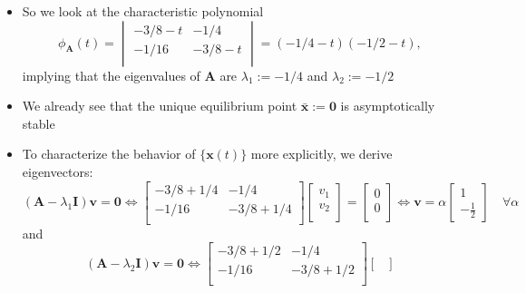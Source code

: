 \documentclass[12pt,a4paper]{article}
\begin{document}
\begin{itemize}
\begin{itemize}
  \item So we look at the characteristic polynomial
    \begin{equation}\nonumber%
      \phi_{\bm{A}}(t) = 
      \begin{vmatrix}
        -3/8 - t & -1/4 \\
        -1/16 & -3/8 - t \\
      \end{vmatrix}
      = (-1/4-t)(-1/2-t),
    \end{equation}
    implying that
    the eigenvalues of $\bm{A}$ are $\lambda_{1}:=-1/4$ and $\lambda_{2}:=-1/2$
  \item We already see that
    the unique equilibrium point
    $\bar{\bm{x}}:=\bm{0}$ is asymptotically stable
  \item To characterize the behavior of $\{\bm{x}(t)\}$ more explicitly,
    we derive eigenvectors:
    \begin{equation}\nonumber%
      (\bm{A}-\lambda_{1}\bm{I})\bm{v}
      = \bm{0}
      \iff
      \begin{bmatrix}
        -3/8 + 1/4 & - 1/4 \\
        -1/16 & -3/8 + 1/4 \\
      \end{bmatrix}
      \begin{bmatrix}
        v_{1} \\
        v_{2} \\
      \end{bmatrix}
      =
      \begin{bmatrix}
        0 \\
        0 \\
      \end{bmatrix}
      \iff
      \bm{v} = \alpha
      \begin{bmatrix}
        1 \\
        -\frac{1}{2}
      \end{bmatrix}
      \quad \forall \alpha
    \end{equation}
    and
    \begin{equation}\nonumber%
      (\bm{A}-\lambda_{2}\bm{I})\bm{v}
      = \bm{0}
      \iff
      \begin{bmatrix}
        -3/8 + 1/2 & - 1/4 \\
        -1/16 & -3/8 + 1/2 \\
      \end{bmatrix}
      \begin{bmatrix}

\end{bmatrix}
\end{equation}
\end{itemize}
\end{itemize}
\end{document}
